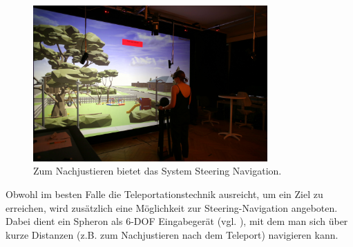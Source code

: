 \begin{figure}[h!]
  \centering
  \includegraphics[width=0.8\textwidth]{images/steering.jpg}
  \caption{Zum Nachjustieren bietet das System Steering Navigation.}
  \label{fig:todo}
\end{figure}


Obwohl im besten Falle die Teleportationstechnik ausreicht, um ein Ziel zu erreichen, wird zusätzlich eine Möglichkeit zur Steering-Navigation angeboten. Dabei dient ein Spheron als 6-DOF Eingabegerät (vgl. \cite{Kulik2011C1x6}), mit dem man sich über kurze Distanzen (z.B. zum Nachjustieren nach dem Teleport) navigieren kann.

